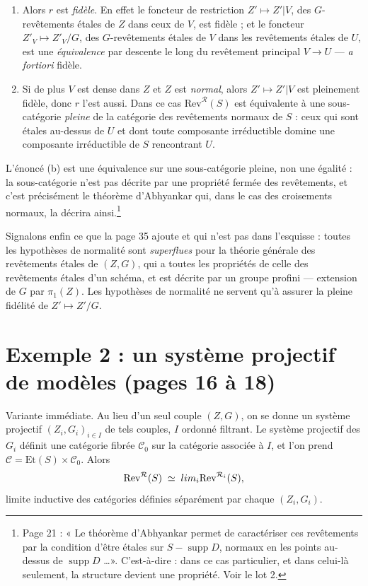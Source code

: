 \documentclass[11pt,a4paper]{article}
\begin{document}
\begin{enumerate}
  \item[(a)] Alors $r$ est \emph{fidèle}. En effet le foncteur de restriction
    $Z' \mapsto Z'|V$, des $G$-revêtements étales de $Z$ dans ceux de $V$, est
    fidèle ; et le foncteur $Z'_{V} \mapsto Z'_{V}/G$, des $G$-revêtements
    étales de $V$ dans les revêtements étales de $U$, est une
    \emph{équivalence} par descente le long du revêtement principal
    $V \to U$ --- \emph{a fortiori} fidèle.
  \item[(b)] Si de plus $V$ est dense dans $Z$ et $Z$ est \emph{normal}, alors
    $Z' \mapsto Z'|V$ est pleinement fidèle, donc $r$ l'est aussi. Dans ce cas
    $\mathrm{Rev}^{\mathcal{R}}(S)$ est équivalente à une sous-catégorie
    \emph{pleine} de la catégorie des revêtements normaux de $S$ : ceux qui
    sont étales au-dessus de $U$ et dont toute composante irréductible domine
    une composante irréductible de $S$ rencontrant $U$.
\end{enumerate}

L'énoncé (b) est une équivalence sur une sous-catégorie pleine, non une
égalité : la sous-catégorie n'est pas décrite par une propriété fermée des
revêtements, et c'est précisément le théorème d'Abhyankar qui, dans le cas des
croisements normaux, la décrira ainsi.\footnote{Page 21 : « Le théorème
d'Abhyankar permet de caractériser ces revêtements par la condition d'être
étales sur $S - \operatorname{supp} D$, normaux en les points au-dessus de
$\operatorname{supp} D$ \dots ». C'est-à-dire : dans ce cas particulier, et
dans celui-là seulement, la structure devient une propriété. Voir le lot 2.}

Signalons enfin ce que la page 35 ajoute et qui n'est pas dans l'esquisse :
toutes les hypothèses de normalité sont \emph{superflues} pour la théorie
générale des revêtements étales de $(Z,G)$, qui a toutes les propriétés de
celle des revêtements étales d'un schéma, et est décrite par un groupe profini
--- extension de $G$ par $\pi_{1}(Z)$. Les hypothèses de normalité ne servent
qu'à assurer la pleine fidélité de $Z' \mapsto Z'/G$.

\section*{Exemple 2 : un système projectif de modèles (pages 16 à 18)}

Variante immédiate. Au lieu d'un seul couple $(Z, G)$, on se donne un système
projectif $(Z_{i}, G_{i})_{i \in I}$ de tels couples, $I$ ordonné filtrant. Le
système projectif des $G_{i}$ définit une catégorie fibrée $\mathcal{C}_{0}$
sur la catégorie associée à $I$, et l'on prend
$\mathcal{C} = \mathrm{Et}(S) \times \mathcal{C}_{0}$. Alors
\[
  \mathrm{Rev}^{\mathcal{R}}(S) \;\simeq\;
  \varinjlim_{i} \mathrm{Rev}^{\mathcal{R}_{i}}(S) ,
\]
limite inductive des catégories définies séparément par chaque $(Z_{i},G_{i})$.
\end{document}
